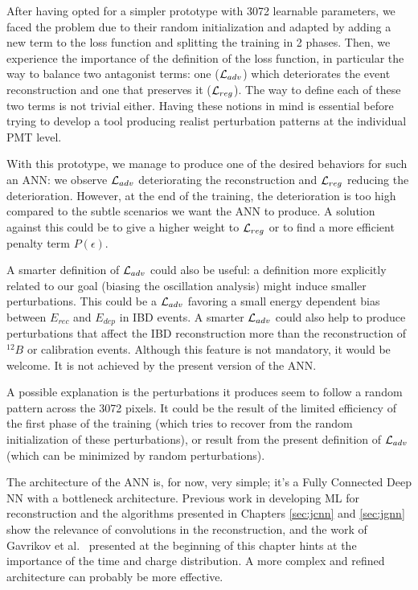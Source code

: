 \documentclass[../main.tex]{subfiles}
\begin{document}
After having opted for a simpler prototype with 3072 learnable parameters, we faced the problem due to their random initialization and adapted by adding a new term to the loss function and splitting the training in 2 phases. Then, we experience the importance of the definition of the loss function, in particular the way to balance two antagonist terms:
one (${\cal L}_{adv}$) which deteriorates the event reconstruction and one that preserves it (${\cal L}_{reg}$). The way to define each of these two terms is not trivial either. Having these notions in mind is essential before trying to develop a tool producing realist perturbation patterns at the individual PMT level.

With this prototype, we manage to produce one of the desired behaviors for such an ANN: we observe ${\cal L}_{adv}$ deteriorating the reconstruction and ${\cal L}_{reg}$ reducing the deterioration. However, at the end of the training, the deterioration is too high compared to the subtle scenarios we want the ANN to produce. A solution against this could be to give a higher weight to ${\cal L}_{reg}$ or to find a more efficient penalty term $P(\epsilon)$.

A smarter definition of ${\cal L}_{adv}$ could also be useful: a definition more explicitly related to our goal (biasing the oscillation analysis) might induce smaller perturbations. This could be a ${\cal L}_{adv}$ favoring a small energy dependent bias between $E_{rec}$ and $E_{dep}$ in IBD events. A smarter ${\cal L}_{adv}$ could also help to produce perturbations that affect the IBD reconstruction more than the reconstruction of $^{12}B$ or calibration events. Although this feature is not mandatory, it would be welcome. It is not achieved by the present version of the ANN.

A possible explanation is the perturbations it produces seem to follow a random pattern across the 3072 pixels. It could be the result of the limited efficiency of the first phase of the training (which tries to recover from the random initialization of these perturbations), or result from the present definition of ${\cal L}_{adv}$ (which can be minimized by random perturbations).

The architecture of the ANN is, for now, very simple; it's a Fully Connected Deep NN with a bottleneck architecture. Previous work in developing ML for reconstruction \cite{qian_vertex_2021} and the algorithms presented in Chapters \ref{sec:jcnn} and \ref{sec:jgnn} show the relevance of convolutions in the reconstruction, and the work of Gavrikov et al.\ \cite{gavrikov_energy_2022} presented at the beginning of this chapter hints at the importance of the time and charge distribution. A more complex and refined architecture can probably be more effective.
\end{document}
